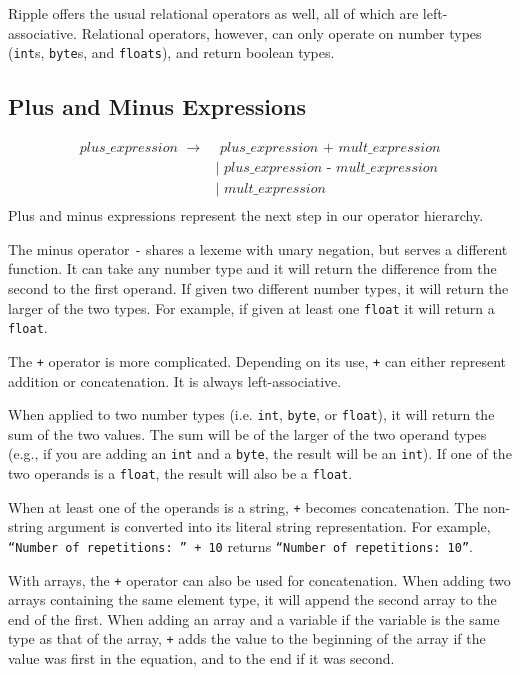 \documentclass{article}
\newcommand{\code}{\texttt}
\begin{document}
Ripple offers the usual relational operators as well, all of which are left-associative. Relational operators, however, can only operate on number types (\code{int}s, \code{byte}s, and \code{floats}), and return boolean types. 

\subsection{Plus and Minus Expressions}
\begin{align*}
plus\_expression\,\,\rightarrow&  \,\,plus\_expression\,\,\code{+}\,\,mult\_expression \\
                    	       &| \,\,plus\_expression\,\,\code{-}\,\,mult\_expression \\
                    	       &| \,\,mult\_expression                                 \\
\end{align*}
Plus and minus expressions represent the next step in our operator hierarchy.

The minus operator \code{-} shares a lexeme with unary negation, but serves a different function. It can take any number type and it will return the difference from the second to the first operand. If given two different number types, it will return the larger of the two types. For example, if given at least one \code{float} it will return a \code{float}.

The \code{+} operator is more complicated. Depending on its use, \code{+} can either represent addition or concatenation. It is always left-associative.

When applied to two number types (i.e. \code{int}, \code{byte}, or \code{float}), it will return the sum of the two values. The sum will be of the larger of the two operand types (e.g., if you are adding an \code{int} and a \code{byte}, the result will be an \code{int}). If one of the two operands is a \code{float}, the result will also be a \code{float}.

When at least one of the operands is a string, \code{+} becomes concatenation. The non-string argument is converted into its literal string representation. For example, \code{``Number of repetitions: '' + 10} returns \code{``Number of repetitions: 10''}.

With arrays, the \code{+} operator can also be used for concatenation. When adding two arrays containing the same element type, it will append the second array to the end of the first. When adding an array and a variable if the variable is the same type as that of the array, \code{+} adds the value to the beginning of the array if the value was first in the equation, and to the end if it was second.
\end{document}

